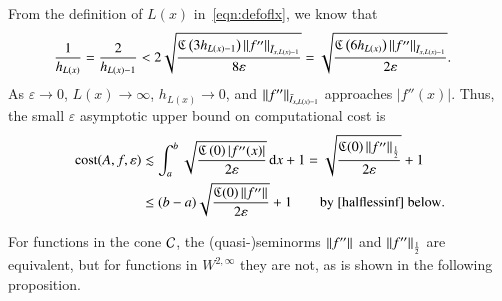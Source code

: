 \documentclass[review]{elsarticle}
\newcommand{\abstol}{\varepsilon}
\theoremstyle{definition}
\renewcommand{\cw}{W}
\begin{document}
From the definition of $L(x)$ in~\eqref{eqn:defoflx}, we know that
\begin{align*}
\frac{1}{h_{L(x)}} = \frac{2}{h_{L(x)-1}}
& < 2 \sqrt{\frac{\fC\left(3 h_{L(x)-1} \right)\norm[\bar{I}_{x,L(x)-1}]{f''} }{8\abstol}}
= \sqrt{\frac{\fC\left(6 h_{L(x)} \right)\norm[\bar{I}_{x,L(x)-1}]{f''} }{2\abstol}}.
\end{align*}
As $\abstol \to 0$, $L(x) \to \infty$, $h_{L(x)} \to 0$, and  $\norm[\bar{I}_{x,L(x)-1}]{f''}$
approaches $|f''(x)|$.  Thus, the small $\abstol$ asymptotic upper bound on
computational cost is
\begin{align}
\cost(A,f,\abstol)
&\lesssim \int_a^b \sqrt{\frac{\fC\left(0\right)   |f''(x)|}{2\abstol}} \, \dif x +1
=\sqrt{\frac{\fC(0) \norm[\frac 12]{f''}}{2\abstol}} +1 \label{costbdapprox} \\
& \le (b-a)\sqrt{\frac{\fC(0) \norm{f''}}{2\abstol}} +1 \label{costbdinf}  \qquad
\text{by \eqref{halflessinf} below}.
\end{align}

For functions in the cone $\cc$, the (quasi-)seminorms $\norm{f''}$ and $\norm[\frac
12]{f''}$ are equivalent, but  for functions in $ \cw^{2,\infty}$ they are not, as is shown in the following proposition.
\end{document}
